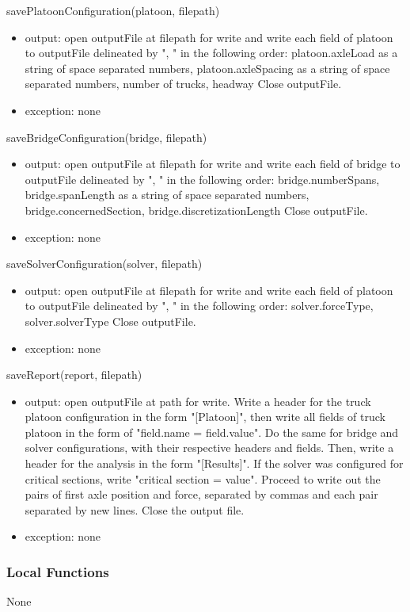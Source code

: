 \documentclass[12pt, titlepage]{article}
\begin{document}
\noindent savePlatoonConfiguration(platoon, filepath)
\begin{itemize}
\item output: open outputFile at filepath for write and write each field of platoon to outputFile delineated by ", " in the following order: 
platoon.axleLoad as a string of space separated numbers, platoon.axleSpacing as a string of space separated numbers, number of trucks, headway
Close outputFile.
\item exception: none
\end{itemize}

\noindent saveBridgeConfiguration(bridge, filepath)
\begin{itemize}
\item output: open outputFile at filepath for write and write each field of bridge to outputFile delineated by ", " in the following order: 
bridge.numberSpans, bridge.spanLength as a string of space separated numbers, bridge.concernedSection, bridge.discretizationLength
Close outputFile.
\item exception: none
\end{itemize}

\noindent saveSolverConfiguration(solver, filepath)
\begin{itemize}
\item output: open outputFile at filepath for write and write each field of platoon to outputFile delineated by ", " in the following order: 
solver.forceType, solver.solverType
Close outputFile.
\item exception: none
\end{itemize}

\noindent saveReport(report, filepath)
\begin{itemize}
\item output: open outputFile at path for write. Write a header for the truck platoon configuration in the form "[Platoon]", then write all fields of truck platoon in the form of "field.name = field.value". Do the same for bridge and solver configurations, with their respective headers and fields. Then, write a header for the analysis in the form "[Results]". If the solver was configured for critical sections, write "critical section = value". Proceed to write out the pairs of first axle position and force, separated by commas and each pair separated by new lines. Close the output file.
\item exception: none
\end{itemize}
\subsubsection{Local Functions}
None
\newpage
\end{document}
